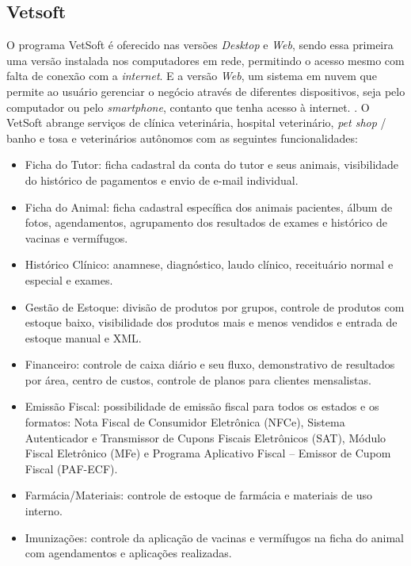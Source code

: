 \documentclass[
    12pt,               %
    openright,          %
    oneside,
    a4paper,            %
    BIBLATEX,           %
    TODO,               %
    english,            %
    brazil              %
    ]{ifsp-spo-inf-ctds}
\begin{document}
        \subsection{Vetsoft}
        O programa VetSoft é oferecido nas versões \emph{Desktop} e \emph{Web}, sendo essa primeira uma versão instalada nos computadores em rede, permitindo o acesso mesmo com falta de conexão com a \emph{internet}. E a versão \emph{Web}, um sistema em nuvem que permite ao usuário gerenciar o negócio através de diferentes dispositivos, seja pelo computador ou pelo \emph{smartphone}, contanto que tenha acesso à internet. . O VetSoft abrange serviços de clínica veterinária, hospital veterinário, \emph{pet shop} / banho e tosa e veterinários autônomos com as seguintes funcionalidades:

\begin{itemize}
    \item Ficha do Tutor: ficha cadastral da conta do tutor e seus animais, visibilidade do histórico de pagamentos e envio de e-mail individual.
    \item Ficha do Animal: ficha cadastral específica dos animais pacientes, álbum de fotos, agendamentos, agrupamento dos resultados de exames e histórico de vacinas e vermífugos.
    \item Histórico Clínico: anamnese, diagnóstico, laudo clínico, receituário normal e especial e exames.
    \item Gestão de Estoque: divisão de produtos por grupos, controle de produtos com estoque baixo, visibilidade dos produtos mais e menos vendidos e entrada de estoque manual e XML.
    \item Financeiro: controle de caixa diário e seu fluxo, demonstrativo de resultados por área, centro de custos, controle de planos para clientes mensalistas.
    \item Emissão Fiscal: possibilidade de emissão fiscal para todos os estados e os formatos: Nota Fiscal de Consumidor Eletrônica (NFCe), Sistema Autenticador e Transmissor de Cupons Fiscais Eletrônicos (SAT), Módulo Fiscal Eletrônico (MFe) e Programa Aplicativo Fiscal – Emissor de Cupom Fiscal (PAF-ECF).
    \item Farmácia/Materiais: controle de estoque de farmácia e materiais de uso interno.
    \item Imunizações: controle da aplicação de vacinas e vermífugos na ficha do animal com agendamentos e aplicações realizadas.
\end{itemize}
\end{document}
